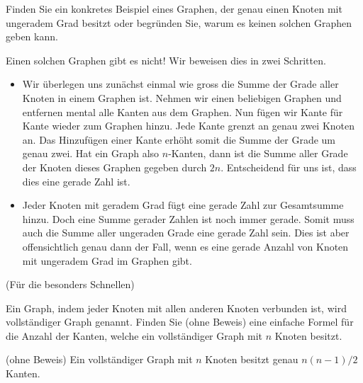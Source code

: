 \begin{myexercise}\label{myexercise:09}
	Finden Sie ein konkretes Beispiel eines Graphen, der genau einen Knoten mit ungeradem Grad besitzt oder begründen Sie, warum es keinen solchen Graphen geben kann.
	\begin{myanswer}\label{myexercise:09-sol}
		Einen solchen Graphen gibt es nicht! Wir beweisen dies in zwei Schritten.
		\begin{itemize}
			\item Wir überlegen uns zunächst einmal wie gross die Summe der Grade aller Knoten in einem Graphen ist. Nehmen wir einen beliebigen Graphen und entfernen mental alle Kanten aus dem Graphen. Nun fügen wir Kante für Kante wieder zum Graphen hinzu. Jede Kante grenzt an genau zwei Knoten an. Das Hinzufügen einer Kante erhöht somit die Summe der Grade um genau zwei. Hat ein Graph also $n$-Kanten, dann ist die Summe aller Grade der Knoten dieses Graphen gegeben durch $2n$. Entscheidend für uns ist, dass dies eine gerade Zahl ist.
			\item Jeder Knoten mit geradem Grad fügt eine gerade Zahl zur Gesamtsumme hinzu. Doch eine Summe gerader Zahlen ist noch immer gerade. Somit muss auch die Summe aller ungeraden Grade eine gerade Zahl sein. Dies ist aber offensichtlich genau dann der Fall, wenn es eine gerade Anzahl von Knoten mit ungeradem Grad im Graphen gibt.
		\end{itemize}
	\end{myanswer}
\end{myexercise}

\begin{myexercise}\label{myexercise:10}
	(Für die besonders Schnellen)

	\noindent
	Ein Graph, indem jeder Knoten mit allen anderen Knoten verbunden ist, wird vollständiger Graph genannt. Finden Sie (ohne Beweis) eine einfache Formel für die Anzahl der Kanten, welche ein vollständiger Graph mit $n$ Knoten besitzt.
	\begin{myanswer}\label{myexercise:10-sol}
		(ohne Beweis) Ein vollständiger Graph mit $n$ Knoten besitzt genau $n(n-1)/2$ Kanten.
	\end{myanswer}
\end{myexercise}
\shipoutAnswer
